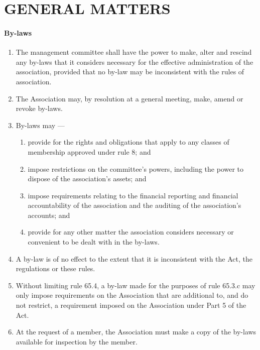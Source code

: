 \documentclass[../constitution.tex]{subfiles}
\begin{document}
\hypertarget{part-8-general-matters}{%
\part{GENERAL MATTERS}\label{part-8-general-matters}}

\hypertarget{by-laws}{%
\subsection{By-laws}\label{by-laws}}

\begin{enumerate}

\item The management committee shall have the power to make, alter and rescind any by-laws that it considers necessary for the effective administration of the association, provided that no by-law may be inconsistent with the rules of association.
\item The Association may, by resolution at a general meeting, make, amend or revoke by-laws.
\item By-laws may ---

  \begin{enumerate}
  
  \item provide for the rights and obligations that apply to any classes of membership approved under rule 8; and
  \item impose restrictions on the committee's powers, including the power to dispose of the association's assets; and
  \item impose requirements relating to the financial reporting and financial accountability of the association and the auditing of the association's accounts; and
  \item provide for any other matter the association considers necessary or convenient to be dealt with in the by-laws.
  \end{enumerate}
\item A by-law is of no effect to the extent that it is inconsistent with the Act, the regulations or these rules.
\item Without limiting rule 65.4, a by-law made for the purposes of rule 65.3.c may only impose requirements on the Association that are additional to, and do not restrict, a requirement imposed on the Association under Part 5 of the Act.
\item At the request of a member, the Association must make a copy of the by-laws available for inspection by the member.
\end{enumerate}
\end{document}
